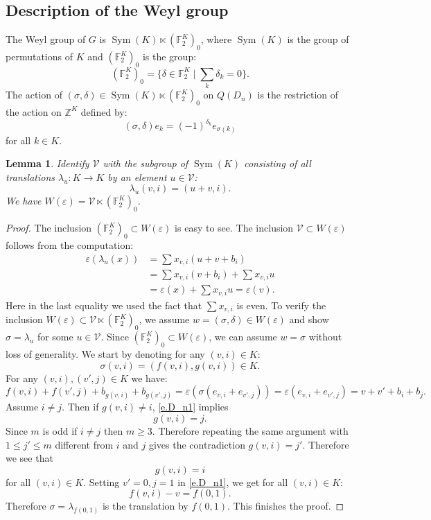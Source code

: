 \documentclass[12pt]{amsart}
\numberwithin{equation}{section}
\newtheorem{lemma}[theorem]{Lemma}
\theoremstyle{definition}
\newcommand{\cV}{\mathcal{V}}
\newcommand{\bF}{\mathbb{F}}
\newcommand{\bZ}{\mathbb{Z}}
\newcommand{\Sym}{\operatorname{Sym}}
\newcommand{\eps}{\varepsilon}
\begin{document}
\subsection*{Description of the Weyl group}
The Weyl group of $G$ is $\Sym(K) \ltimes (\bF_2^{K})_0$, where $\Sym(K)$ is the group of permutations of $K$ and $(\bF_2^{K})_0$ is the group:
$$(\bF_2^{K})_0=\{ \delta\in \bF_2^{K} \mid \sum_k \delta_k = 0\}.$$
The action of $(\sigma,\delta)\in \Sym(K) \ltimes (\bF_2^{K})_0$ on $Q(D_n)$ is the restriction of the action on $\bZ^K$ defined by:
\begin{equation}\label{e.act_W(eps)_Dn}
(\sigma,\delta)e_k = (-1)^{\delta_k} e_{\sigma(k)}
\end{equation}
for all $k\in K$.
\begin{lemma}\label{lem.WepsDn}
    Identify $\cV$ with the subgroup of $\Sym(K)$ consisting of all translations $\lambda_u: K\to K$ by an element $u\in \cV$:
$$\lambda_u(v,i) = (u+v,i).$$
    We have $W(\eps) = \cV \ltimes (\bF_2^{K})_0$.
\end{lemma}
\begin{proof}
The inclusion $(\bF_2^K)_0 \subset W(\eps)$ is easy to see. The inclusion $\cV\subset W(\eps)$ follows from the computation:
\begin{align*}
    \eps(\lambda_u(x)) &= \sum x_{v,i}(u+v + b_i)  \\
        &= \sum x_{v,i}(v+ b_i) +\sum x_{v,i}u \\
        &= \eps(x) + \sum x_{v,i} u = \eps(v).
\end{align*}
Here in the last equality we used the fact that $\sum x_{v,i}$ is even.
To verify the inclusion $W(\eps)\subset \cV\ltimes (\bF_2^{K})_0$, we assume $w=(\sigma,\delta) \in W(\eps)$  and show $\sigma = \lambda_u$ for some $u\in \cV$. Since $(\bF_2^K)_0\subset W(\eps)$, we can assume $w = \sigma$ without loss of generality. We start by denoting for any $(v,i)\in K$:
$$\sigma(v,i) = (f(v,i),g(v,i))\in K.$$
For any $(v,i),(v',j)\in K$ we have:
\begin{equation}\label{e.D_n1}
    f(v,i) + f(v',j) + b_{g(v,i)} + b_{g(v',j)} = \eps(\sigma(e_{v,i} + e_{v',j})) = \eps(e_{v,i} + e_{v',j}) = v+v' + b_i + b_j.
\end{equation}
Assume $i\neq j$. Then if $g(v,i) \neq i$, \eqref{e.D_n1} implies $$g(v,i) = j.$$ Since $m$ is odd if $i\neq j$ then $m\geq 3$. Therefore repeating the same argument with $1\leq j'\leq m$ different from $i$ and $j$ gives the contradiction $g(v,i) = j'$. Therefore we see that $$g(v,i) = i$$ for all $(v,i)\in K$. Setting $v'= 0, j =1$ in \eqref{e.D_n1}, we get for all $(v,i)\in K$:
$$f(v,i) - v = f(0,1).$$
Therefore $\sigma = \lambda_{f(0,1)}$ is the translation by $f(0,1)$. This finishes the proof.
\end{proof}
\end{document}
